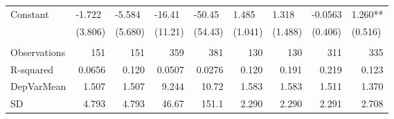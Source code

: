 \begin{tabular}{lrrrrrrrr}
Constant & \multicolumn{1}{l}{-1.722} & \multicolumn{1}{l}{-5.584} & \multicolumn{1}{l}{-16.41} & \multicolumn{1}{l}{-50.45} & \multicolumn{1}{l}{1.485} & \multicolumn{1}{l}{1.318} & \multicolumn{1}{l}{-0.0563} & \multicolumn{1}{l}{1.260**} \\
      & \multicolumn{1}{l}{(3.806)} & \multicolumn{1}{l}{(5.680)} & \multicolumn{1}{l}{(11.21)} & \multicolumn{1}{l}{(54.43)} & \multicolumn{1}{l}{(1.041)} & \multicolumn{1}{l}{(1.488)} & \multicolumn{1}{l}{(0.406)} & \multicolumn{1}{l}{(0.516)} \\
      &       &       &       &       &       &       &       &  \\
      \midrule
Observations & 151   & 151   & 359   & 381   & 130   & 130   & 311   & 335 \\
R-squared & 0.0656 & 0.120 & 0.0507 & 0.0276 & 0.120 & 0.191 & 0.219 & 0.123 \\
DepVarMean & 1.507 & 1.507 & 9.244 & 10.72 & 1.583 & 1.583 & 1.511 & 1.370 \\
SD    & 4.793 & 4.793 & 46.67 & 151.1 & 2.290 & 2.290 & 2.291 & 2.708 \\
\bottomrule
\bottomrule
\end{tabular}%
